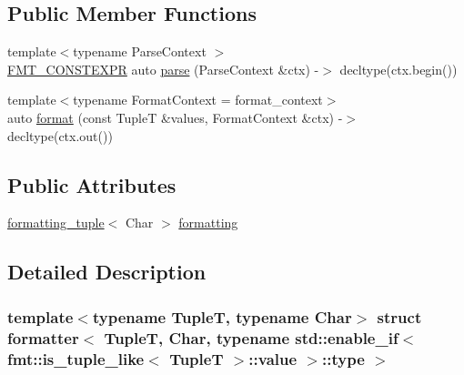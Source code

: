 \subsection*{Public Member Functions}
\begin{DoxyCompactItemize}
\item 
{\footnotesize template$<$typename Parse\+Context $>$ }\\\hyperlink{core_8h_a69201cb276383873487bf68b4ef8b4cd}{F\+M\+T\+\_\+\+C\+O\+N\+S\+T\+E\+X\+PR} auto \hyperlink{structformatter_3_01_tuple_t_00_01_char_00_01typename_01std_1_1enable__if_3_01fmt_1_1is__tuple__a8a88f793f5f612c28a21643fc88182d_a7b66a353e2b9bf7e2806058857e03d90}{parse} (Parse\+Context \&ctx) -\/$>$ decltype(ctx.\+begin())
\item 
{\footnotesize template$<$typename Format\+Context  = format\+\_\+context$>$ }\\auto \hyperlink{structformatter_3_01_tuple_t_00_01_char_00_01typename_01std_1_1enable__if_3_01fmt_1_1is__tuple__a8a88f793f5f612c28a21643fc88182d_a7d5dc29d45fc8f500059ce69020b2ea6}{format} (const TupleT \&values, Format\+Context \&ctx) -\/$>$ decltype(ctx.\+out())
\end{DoxyCompactItemize}
\subsection*{Public Attributes}
\begin{DoxyCompactItemize}
\item 
\hyperlink{structformatting__tuple}{formatting\+\_\+tuple}$<$ Char $>$ \hyperlink{structformatter_3_01_tuple_t_00_01_char_00_01typename_01std_1_1enable__if_3_01fmt_1_1is__tuple__a8a88f793f5f612c28a21643fc88182d_a25cee26a4ffe9ca5631076f4eb6cf865}{formatting}
\end{DoxyCompactItemize}


\subsection{Detailed Description}
\subsubsection*{template$<$typename TupleT, typename Char$>$\newline
struct formatter$<$ Tuple\+T, Char, typename std\+::enable\+\_\+if$<$ fmt\+::is\+\_\+tuple\+\_\+like$<$ Tuple\+T $>$\+::value $>$\+::type $>$}



